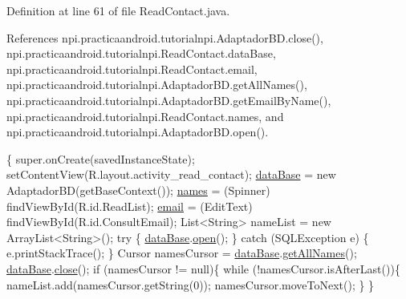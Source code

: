 Definition at line 61 of file Read\-Contact.\-java.



References npi.\-practicaandroid.\-tutorialnpi.\-Adaptador\-B\-D.\-close(), npi.\-practicaandroid.\-tutorialnpi.\-Read\-Contact.\-data\-Base, npi.\-practicaandroid.\-tutorialnpi.\-Read\-Contact.\-email, npi.\-practicaandroid.\-tutorialnpi.\-Adaptador\-B\-D.\-get\-All\-Names(), npi.\-practicaandroid.\-tutorialnpi.\-Adaptador\-B\-D.\-get\-Email\-By\-Name(), npi.\-practicaandroid.\-tutorialnpi.\-Read\-Contact.\-names, and npi.\-practicaandroid.\-tutorialnpi.\-Adaptador\-B\-D.\-open().


\begin{DoxyCode}
                                                       \{
        super.onCreate(savedInstanceState);
        setContentView(R.layout.activity\_read\_contact);
        \hyperlink{classnpi_1_1practicaandroid_1_1tutorialnpi_1_1_read_contact_a35e00fc352147780c9383f53d25227dd}{dataBase} = \textcolor{keyword}{new} AdaptadorBD(getBaseContext());
        \hyperlink{classnpi_1_1practicaandroid_1_1tutorialnpi_1_1_read_contact_ab89bd29616ad083286050296c58a408d}{names} = (Spinner) findViewById(R.id.ReadList);
        \hyperlink{classnpi_1_1practicaandroid_1_1tutorialnpi_1_1_read_contact_acac2ea2aae6d7bc822b86c9ee620f3e6}{email} = (EditText) findViewById(R.id.ConsultEmail);
        List<String> nameList = \textcolor{keyword}{new} ArrayList<String>();
        \textcolor{keywordflow}{try} \{
            \hyperlink{classnpi_1_1practicaandroid_1_1tutorialnpi_1_1_read_contact_a35e00fc352147780c9383f53d25227dd}{dataBase}.\hyperlink{classnpi_1_1practicaandroid_1_1tutorialnpi_1_1_adaptador_b_d_a128413ac90cfc708b95c21d946f9600d}{open}();
        \} \textcolor{keywordflow}{catch} (SQLException e) \{
            e.printStackTrace();
        \}
        Cursor namesCursor = \hyperlink{classnpi_1_1practicaandroid_1_1tutorialnpi_1_1_read_contact_a35e00fc352147780c9383f53d25227dd}{dataBase}.\hyperlink{classnpi_1_1practicaandroid_1_1tutorialnpi_1_1_adaptador_b_d_ab57b493581975afbbf05b835c4fa4f21}{getAllNames}();
        \hyperlink{classnpi_1_1practicaandroid_1_1tutorialnpi_1_1_read_contact_a35e00fc352147780c9383f53d25227dd}{dataBase}.\hyperlink{classnpi_1_1practicaandroid_1_1tutorialnpi_1_1_adaptador_b_d_a466dc4c61ae61457cf986b5d8c6f6f52}{close}();
        \textcolor{keywordflow}{if} (namesCursor != null)\{
            \textcolor{keywordflow}{while} (!namesCursor.isAfterLast())\{
                nameList.add(namesCursor.getString(0));
                namesCursor.moveToNext();
            \}
        \}
        

\end{DoxyCode}

